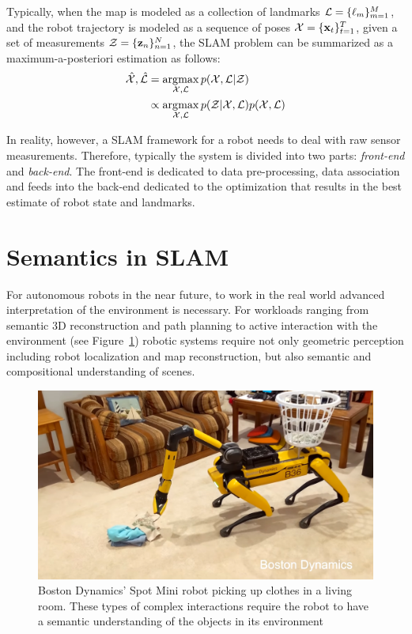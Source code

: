 Typically, when the map is modeled as a collection of landmarks $ \mathcal{L} = \{\ell_m\}_{m=1}^{M} $, and the robot trajectory is modeled as a sequence of poses $\mathcal{X} = \{\mathbf{x}_t\}_{t=1}^{T}$, given a set of measurements $ \mathcal{Z} = \{\mathbf{z}_n\}_{n=1}^{N}$, the SLAM problem can be summarized as a maximum-a-posteriori estimation \cite{dellaertFactorGraphsRobot2017} as follows:
\begin{align}
    \hat{\mathcal{X}}, \hat{\mathcal{L}} &= \operatorname*{\arg\!\max}_{\mathcal{X}, \mathcal{L}} p(\mathcal{X}, \mathcal{L} | \mathcal{Z}) \\
                         &\propto \operatorname*{\arg\!\max}_{\mathcal{X}, \mathcal{L}} p(\mathcal{Z} | \mathcal{X}, \mathcal{L}) p(\mathcal{X}, \mathcal{L})
\end{align}

In reality, however, a SLAM framework for a robot needs to deal with raw sensor measurements. Therefore, typically the system is divided into two parts: \emph{front-end} and \emph{back-end}. The front-end is dedicated to data pre-processing, data association and feeds into the back-end dedicated to the optimization that results in the best estimate of robot state and landmarks.

\section{Semantics in SLAM}

For autonomous robots in the near future, to work in the real world advanced interpretation of the environment is necessary. For workloads ranging from semantic 3D reconstruction and path planning to active interaction with the environment (see Figure~\ref{fig:spot-mini}) robotic systems require not only geometric perception including robot localization and map reconstruction, but also semantic and compositional understanding of scenes.

\begin{figure}[htpb]
    \centering
    \includegraphics[width=0.8\linewidth]{figs/Spots-Got-an-Arm.png}
    \caption{Boston Dynamics' Spot Mini robot picking up clothes in a living room. These types of complex interactions require the robot to have a semantic understanding of the objects in its environment}%
    \label{fig:spot-mini}
\end{figure}


